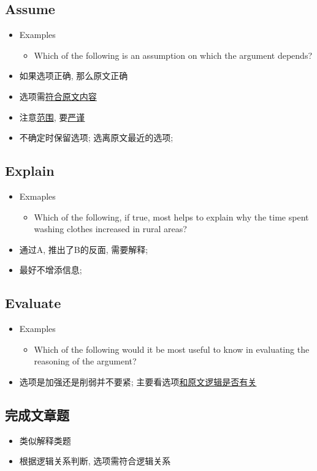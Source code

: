   \subsection{Assume}

    \begin{itemize}
      \item Examples
      \begin{itemize}
        \item Which of the following is an assumption on which the
        argument depends?
      \end{itemize}

      \item 如果选项正确, 那么原文正确
      \item 选项需\uline{符合原文内容}
      \item 注意\uline{范围}, 要\uline{严谨}
      \item 不确定时保留选项; 选离原文最近的选项;
    \end{itemize}

  \subsection{Explain}

    \begin{itemize}
      \item Exmaples
      \begin{itemize}
        \item Which of the following, if true, most helps to explain why
        the time spent washing clothes increased in rural areas?
      \end{itemize}

      \item 通过A, 推出了B的反面, 需要解释;
      \item 最好不增添信息;
    \end{itemize}

  \subsection{Evaluate}

    \begin{itemize}
      \item Examples
      \begin{itemize}
        \item Which of the following would it be most useful to know in
        evaluating the reasoning of the argument?
      \end{itemize}

      \item 选项是加强还是削弱并不要紧; 主要看选项\uline{和原文逻辑是否有关}
    \end{itemize}

  \subsection{完成文章题}

    \begin{itemize}
      \item 类似解释类题
      \item 根据逻辑关系判断, 选项需符合逻辑关系
    \end{itemize}